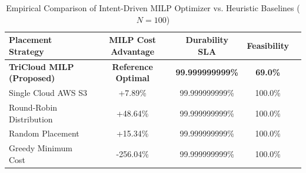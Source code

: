 \begin{table}[t]
\centering
\caption{Empirical Comparison of Intent-Driven MILP Optimizer vs. Heuristic Baselines ($N=100$)}
\label{tab:milp_vs_baselines}
\begin{tabular}{lcccc}
\toprule
\textbf{Placement Strategy} & \textbf{MILP Cost Advantage} & \textbf{Durability SLA} & \textbf{Feasibility} \\
\midrule
\textbf{TriCloud MILP (Proposed)} & \textbf{Reference Optimal} & \textbf{99.999999999\%} & \textbf{69.0\%} \\
Single Cloud AWS S3 & +7.89\% & 99.999999999\% & 100.0\% \\
Round-Robin Distribution & +48.64\% & 99.999999999\% & 100.0\% \\
Random Placement & +15.34\% & 99.999999999\% & 100.0\% \\
Greedy Minimum Cost & -256.04\% & 99.999999999\% & 100.0\% \\
\bottomrule
\end{tabular}
\end{table}

